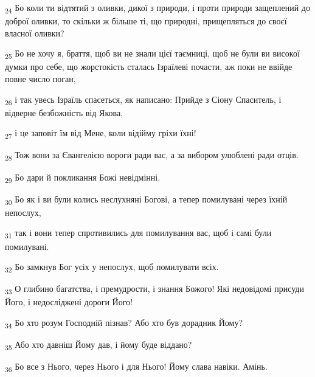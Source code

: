 \begin{tcolorbox}
\textsubscript{24} Бо коли ти відтятий з оливки, дикої з природи, і проти природи защеплений до доброї оливки, то скільки ж більше ті, що природні, прищепляться до своєї власної оливки?
\end{tcolorbox}
\begin{tcolorbox}
\textsubscript{25} Бо не хочу я, браття, щоб ви не знали цієї таємниці, щоб не були ви високої думки про себе, що жорстокість сталась Ізраїлеві почасти, аж поки не ввійде повне число поган,
\end{tcolorbox}
\begin{tcolorbox}
\textsubscript{26} і так увесь Ізраїль спасеться, як написано: Прийде з Сіону Спаситель, і відверне безбожність від Якова,
\end{tcolorbox}
\begin{tcolorbox}
\textsubscript{27} і це заповіт їм від Мене, коли відійму гріхи їхні!
\end{tcolorbox}
\begin{tcolorbox}
\textsubscript{28} Тож вони за Євангелією вороги ради вас, а за вибором улюблені ради отців.
\end{tcolorbox}
\begin{tcolorbox}
\textsubscript{29} Бо дари й покликання Божі невідмінні.
\end{tcolorbox}
\begin{tcolorbox}
\textsubscript{30} Бо як і ви були колись неслухняні Богові, а тепер помилувані через їхній непослух,
\end{tcolorbox}
\begin{tcolorbox}
\textsubscript{31} так і вони тепер спротивились для помилування вас, щоб і самі були помилувані.
\end{tcolorbox}
\begin{tcolorbox}
\textsubscript{32} Бо замкнув Бог усіх у непослух, щоб помилувати всіх.
\end{tcolorbox}
\begin{tcolorbox}
\textsubscript{33} О глибино багатства, і премудрости, і знання Божого! Які недовідомі присуди Його, і недосліджені дороги Його!
\end{tcolorbox}
\begin{tcolorbox}
\textsubscript{34} Бо хто розум Господній пізнав? Або хто був дорадник Йому?
\end{tcolorbox}
\begin{tcolorbox}
\textsubscript{35} Або хто давніш Йому дав, і йому буде віддано?
\end{tcolorbox}
\begin{tcolorbox}
\textsubscript{36} Бо все з Нього, через Нього і для Нього! Йому слава навіки. Амінь.
\end{tcolorbox}
